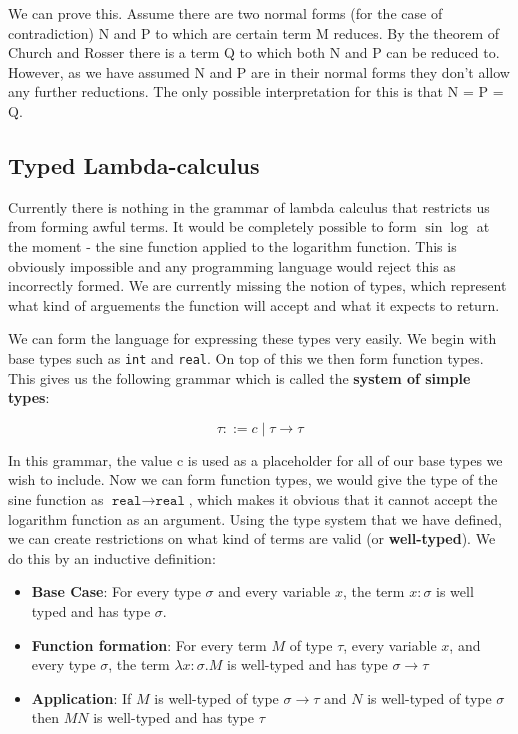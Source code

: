 \documentclass[11pt]{article}
\begin{document}
	\par
	We can prove this. Assume there are two normal forms (for the case of contradiction) N and P to which are certain term M reduces. By the theorem of Church and Rosser there is a term Q to which both N and P can be reduced to. However, as we have assumed N and P are in their normal forms they don't allow any further reductions. The only possible interpretation for this is that N = P = Q.
	
	\subsection{Typed Lambda-calculus}
	Currently there is nothing in the grammar of lambda calculus that restricts us from forming awful terms. It would be completely possible to form $\sin \log$ at the moment - the sine function applied to the logarithm function. This is obviously impossible and any programming language would reject this as incorrectly formed. We are currently missing the notion of types, which represent what kind of arguements the function will accept and what it expects to return.
	
	\par 
	We can form the language for expressing these types very easily. We begin with base types such as \texttt{int} and \texttt{real}. On top of this we then form function types. This gives us the following grammar which is called the \textbf{system of simple types}:
	
	\[ \tau ::= c \; | \; \tau \rightarrow \tau \]
	
	\par In this grammar, the value c is used as a placeholder for all of our base types we wish to include. Now we can form function types, we would give the type of the sine function as $\texttt{real} \rightarrow \texttt{real}$, which makes it obvious that it cannot accept the logarithm function as an argument. Using the type system that we have defined, we can create restrictions on what kind of terms are valid (or \textbf{well-typed}). We do this by an inductive definition:
	\begin{itemize}
		\item \textbf{Base Case}: For every type $\sigma$ and every variable $x$, the term $x:\sigma$ is well typed and has type $\sigma$.
		\item \textbf{Function formation}: For every term $M$ of type $\tau$, every variable $x$, and every type $\sigma$, the term $\lambda x:\sigma .M$ is well-typed and has type $\sigma \rightarrow \tau$
		\item \textbf{Application}: If $M$ is well-typed of type $\sigma \rightarrow \tau$ and $N$ is well-typed of type $\sigma$ then $M N$ is well-typed and has type $\tau$
	\end{itemize}	
	
	
	\newpage
	\printindex
\end{document}

